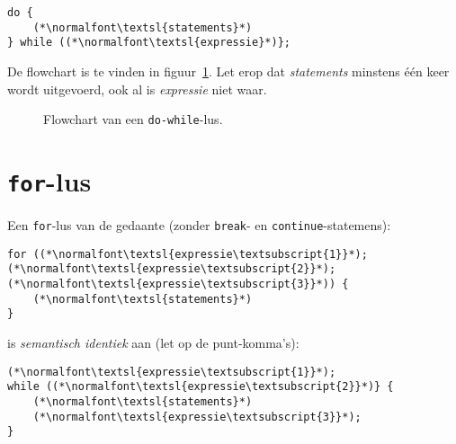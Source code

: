 \begin{lstlisting}[caption=Do-while-lus in C.]
do {
    (*\normalfont\textsl{statements}*)
} while ((*\normalfont\textsl{expressie}*)};
\end{lstlisting}

De flowchart is te vinden in figuur~\ref{fig:flodowhile}.
Let erop dat \textsl{statements} minstens \'e\'en keer wordt uitgevoerd, ook al is \textsl{expressie}
niet waar.

\begin{figure}[!ht]
\centering
{}
\caption{Flowchart van een \texttt{do-while}-lus.}
\label{fig:flodowhile}
\end{figure}


\newpage
\section{\texttt{for}-lus}

Een \texttt{for}-lus van de gedaante (zonder \texttt{break}- en \texttt{continue}-statemens):
\newpage
\begin{lstlisting}[caption=\texttt{for}-lus in C.]
for ((*\normalfont\textsl{expressie\textsubscript{1}}*); (*\normalfont\textsl{expressie\textsubscript{2}}*); (*\normalfont\textsl{expressie\textsubscript{3}}*)) {
    (*\normalfont\textsl{statements}*)
}
\end{lstlisting}

is \textsl{semantisch identiek} aan (let op de punt-komma's):

\begin{lstlisting}[caption=\texttt{for}-lus herschreven als \texttt{while}-lus in C.]
(*\normalfont\textsl{expressie\textsubscript{1}}*);
while ((*\normalfont\textsl{expressie\textsubscript{2}}*)} {
    (*\normalfont\textsl{statements}*)
    (*\normalfont\textsl{expressie\textsubscript{3}}*);
}
\end{lstlisting}

